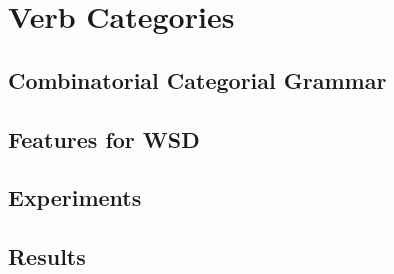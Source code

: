 \chapter{Verb Categories}

\section{Combinatorial Categorial Grammar}

\section{Features for WSD}

\section{Experiments}

\section{Results}

